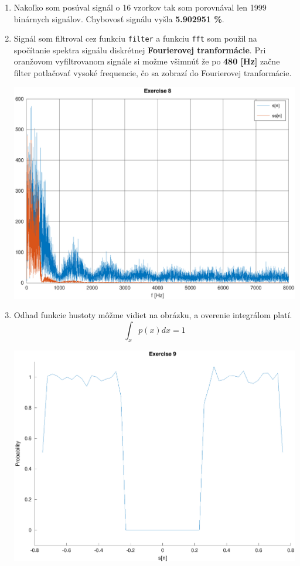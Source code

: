 \documentclass[11pt, a4paper,twocolumn]{article}
\begin{document}
\begin{enumerate}
    \item
    {
        Nakoľko som posúval signál o 16 vzorkov tak som porovnával len 1999 binárnych signálov. Chybovosť signálu vyšla \textbf{5.902951 \%}.
    }

    \item
    {
        Signál som filtroval cez funkciu \texttt{filter} a funkciu \texttt{fft} som použil na spočítanie spektra signálu diskrétnej \textbf{Fourierovej tranformácie}. Pri oranžovom vyfiltrovanom signále si možme všimnúť že po \textbf{480 [Hz]} začne filter potlačovať vysoké frequencie, čo sa zobrazí do Fourierovej tranformácie.
        \begin{center}
        \includegraphics[width=\linewidth,keepaspectratio]{include/8.eps}
        \end{center}
    }

    \item
    {
        Odhad funkcie hustoty môžme vidiet na obrázku, a overenie integrálom platí. $$\int_{x}p(x)dx = 1$$
        \begin{center}
        \includegraphics[width=\linewidth,keepaspectratio]{include/9.eps}
        \end{center}
    }


\end{enumerate}
\end{document}
